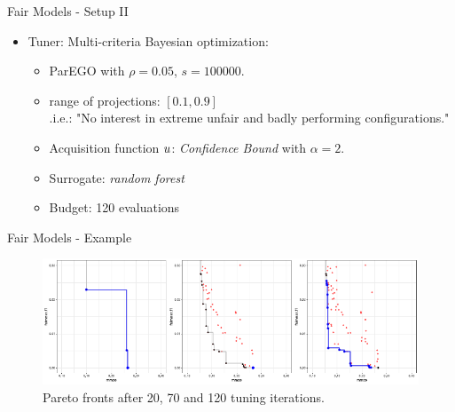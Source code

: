 \begin{frame}{Fair Models - Setup II}
\begin{itemize}
  \item Tuner: Multi-criteria Bayesian optimization:
  \begin{itemize}
    \item ParEGO with $\rho = 0.05$, $s = 100000$.
    \item range of projections: $[0.1, 0.9]$ \\
    .i.e.: "No interest in extreme unfair and badly performing configurations."
    \item Acquisition function $u$: \emph{Confidence Bound} with $\alpha = 2$.
    \item Surrogate: \emph{random forest}
    \item Budget: 120 evaluations
  \end{itemize}
\end{itemize}
    
\end{frame}

\begin{frame}{Fair Models - Example}
\begin{figure}[ht]
\centering
\includegraphics{images/Pfisterer_et_al_2019_Multi_Objective_fig4.pdf}
\caption{Pareto fronts after 20, 70 and 120 tuning iterations.}
\end{figure}
\end{frame}


